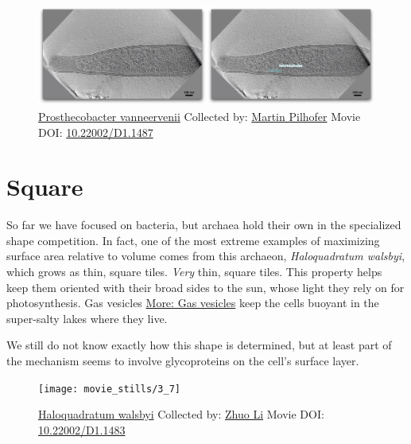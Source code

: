 \documentclass[]{tufte-book}
\begin{document}
\begin{figure}
\includegraphics{movie_stills/3_6a} \caption[\protect\hyperlink{tree}{Prosthecobacter vanneervenii}
Collected by: \protect\hyperlink{martin_pilhofer}{Martin Pilhofer} Movie
DOI: \href{https://doi.org/10.22002/D1.1487}{10.22002/D1.1487}]{\protect\hyperlink{tree}{Prosthecobacter vanneervenii}
Collected by: \protect\hyperlink{martin_pilhofer}{Martin Pilhofer} Movie
DOI: \href{https://doi.org/10.22002/D1.1487}{10.22002/D1.1487}}\label{fig:3-6a}
\end{figure}

\section{Square}\label{square}

So far we have focused on bacteria, but archaea hold their own in the
specialized shape competition. In fact, one of the most extreme examples
of maximizing surface area relative to volume comes from this archaeon,
\emph{Haloquadratum walsbyi}, which grows as thin, square tiles.
\emph{Very} thin, square tiles. This property helps keep them oriented
with their broad sides to the sun, whose light they rely on for
photosynthesis. Gas vesicles \protect\hyperlink{Gas_vesicles}{More: Gas
vesicles} keep the cells buoyant in the super-salty lakes where they
live.

We still do not know exactly how this shape is determined, but at least
part of the mechanism seems to involve glycoproteins on the cell's
surface layer.





\begin{figure}
\texttt{[image: movie\_stills/3\_7]} \caption[\protect\hyperlink{tree}{Haloquadratum walsbyi} Collected by:
\protect\hyperlink{zhuo_li}{Zhuo Li} Movie DOI:
\href{https://doi.org/10.22002/D1.1483}{10.22002/D1.1483}]{\protect\hyperlink{tree}{Haloquadratum walsbyi} Collected by:
\protect\hyperlink{zhuo_li}{Zhuo Li} Movie DOI:
\href{https://doi.org/10.22002/D1.1483}{10.22002/D1.1483}}\label{fig:3-7}
\end{figure}
\end{document}
